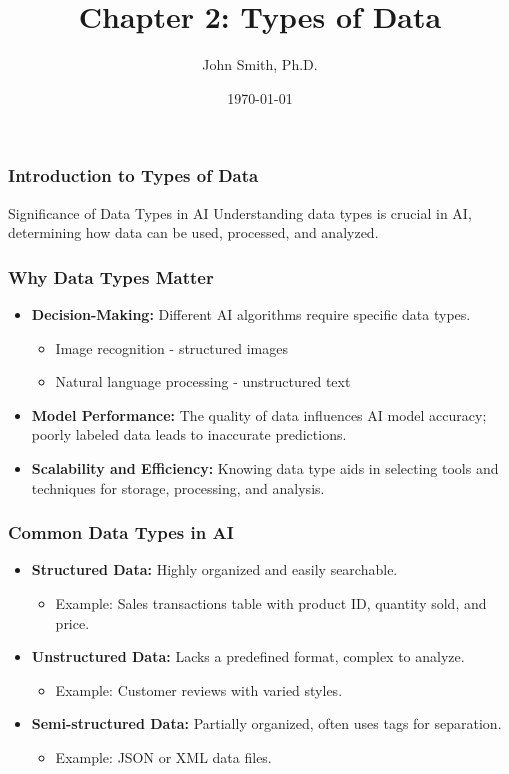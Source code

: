 \documentclass[aspectratio=169]{beamer}
\title[Data Types]{Chapter 2: Types of Data}
\author[J. Smith]{John Smith, Ph.D.}
\institute[University Name]{
  Department of Computer Science\\
  University Name\\
  \vspace{0.3cm}
  Email: email@university.edu\\
  Website: www.university.edu
}
\date{\today}
\begin{document}
\frame{\titlepage}

\begin{frame}[fragile]
    \frametitle{Introduction to Types of Data}
    \begin{block}{Significance of Data Types in AI}
        Understanding data types is crucial in AI, determining how data can be used, processed, and analyzed.
    \end{block}
\end{frame}

\begin{frame}[fragile]
    \frametitle{Why Data Types Matter}
    \begin{itemize}
        \item \textbf{Decision-Making:} 
        Different AI algorithms require specific data types. 
        \begin{itemize}
            \item Image recognition - structured images
            \item Natural language processing - unstructured text
        \end{itemize}
        
        \item \textbf{Model Performance:} 
        The quality of data influences AI model accuracy; poorly labeled data leads to inaccurate predictions.
        
        \item \textbf{Scalability and Efficiency:} 
        Knowing data type aids in selecting tools and techniques for storage, processing, and analysis.
    \end{itemize}
\end{frame}

\begin{frame}[fragile]
    \frametitle{Common Data Types in AI}
    \begin{itemize}
        \item \textbf{Structured Data:} 
        Highly organized and easily searchable.
        \begin{itemize}
            \item Example: Sales transactions table with product ID, quantity sold, and price.
        \end{itemize}

        \item \textbf{Unstructured Data:} 
        Lacks a predefined format, complex to analyze.
        \begin{itemize}
            \item Example: Customer reviews with varied styles.
        \end{itemize}

        \item \textbf{Semi-structured Data:} 
        Partially organized, often uses tags for separation.
        \begin{itemize}
            \item Example: JSON or XML data files.
        \end{itemize}
    \end{itemize}
\end{frame}
\end{document}
